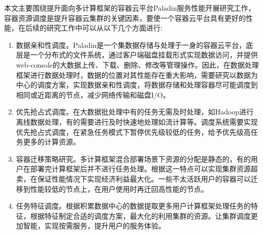 本文主要围绕提升面向多计算框架的容器云平台Paladin服务性能开展研究工作，容器资源调度是提升容器云集群的关键因素，要使一个容器云平台具有更好的性能，在后续的研究工作中可以从以下几个方面进行:
\begin{enumerate}[1.]
	\item 数据亲和性调度。Paladin是一个集数据存储与处理于一身的容器云平台，底层是一个分布式的文件系统，通过客户端磁盘挂载形式实现数据访问，并提供web-console的大数据上传、下载、删除、修改等管理操作。因此，在数据处理框架进行数据处理时，数据的位置对其性能存在重大影响，需要研究以数据为中心的调度方案，实现数据亲和性调度，将数据存储和处理容器尽可能调度到相同或近距离的节点，减少网络传输和磁盘I/O。
	\item 优先抢占式调度。在大数据批处理中有的任务无需及时处理，如Hadoop进行离线数据处理，有的需要进行及时快速地处理如流计算等。调度系统需要实现优先抢占式调度，在紧急任务模式下暂停优先级较低的任务，给予优先级高任务更多的计算资源。
	\item 容器迁移策略研究。多计算框架混合部署场景下资源的分配是静态的，有的用户在部署完计算框架后并不进行任务处理。根据这一特点可以实现集群资源超卖，在保证性能情况下实现经济利益最大化。一些不太活跃用户的容器可以迁移到性能较低的节点上，在用户使用时再迁回高性能的节点。
	\item 任务特征调度。根据积累数据中心的数据提取更多用户计算框架处理任务的特征，根据特征制定合适的调度方案，最大化的利用集群的资源。让集群调度更加智能，实现按需服务，提升用户的服务体验。
\end{enumerate}